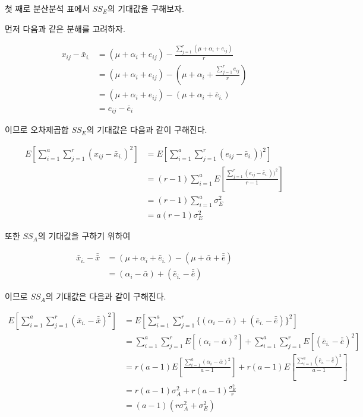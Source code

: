 \documentclass[
]{book}
\theoremstyle{definition}
\theoremstyle{definition}
\theoremstyle{definition}
\theoremstyle{remark}
\begin{document}
첫 째로 분산분석 표에서 \(SS_E\)의 기대값을 구해보자.

먼저 다음과 같은 분해를 고려하자.

\begin{align*}
x_{ij}-\bar x_{i.} &= (\mu + \alpha_i + e_{ij}) -\frac{ \sum_{j=1}^r (\mu + \alpha_i + e_{ij})}{r} \\
 & = (\mu + \alpha_i + e_{ij})  - \left (\mu + \alpha_i + \frac{ \sum_{j=1}^r e_{ij}}{r} \right ) \\ 
 & = (\mu + \alpha_i + e_{ij}) -(\mu + \alpha_i + \bar e_{i.}) \\
 &= e_{ij}-\bar e_{i}
\end{align*}

이므로 오차제곱합 \(SS_E\)의 기대값은 다음과 같이 구해진다.

\begin{align*}
 E \left [ \sum_{i=1}^a \sum_{j=1}^r (x_{ij}-\bar x_{i.})^2 \right ] 
 &= E \left [ \sum_{i=1}^a \sum_{j=1}^r (e_{ij}-\bar e_{i.}))^2 \right ] \\
 &= (r-1) \sum_{i=1}^a E \left [ \frac{   \sum_{j=1}^r  (e_{ij}-\bar e_{i.}))^2 }{r-1} \right ] \\
 &= (r-1) \sum_{i=1}^a \sigma^2_E \\
 &= a(r-1) \sigma^2_E 
\end{align*}

또한 \(SS_A\)의 기대값을 구하기 위하여

\begin{align*}
\bar x_{i.} -\bar {\bar x}  &= (\mu + \alpha_i + \bar e_{i.}) -(\mu + \bar \alpha + \bar {\bar e}) \\
  & = (\alpha_i -\bar \alpha) + (\bar e_{i.}- \bar {\bar e}) 
\end{align*}

이므로 \(SS_A\)의 기대값은 다음과 같이 구해진다.

\begin{align*}
 E \left [ \sum_{i=1}^a \sum_{j=1}^r (\bar x_{i.} -\bar {\bar x} )^2 \right ]
 &= E \left [ \sum_{i=1}^a \sum_{j=1}^r \{(\alpha_i -\bar \alpha) + (\bar e_{i.}-\bar {\bar e})\}^2 \right ] \\
 &= \sum_{i=1}^a \sum_{j=1}^r E  [(\alpha_i -\bar \alpha)^2 ] + \sum_{i=1}^a \sum_{j=1}^r E  [(\bar e_{i.}- \bar{\bar e})^2 ]  \\
 &= r(a-1)E \left  [    \frac{\sum_{i=1}^a(\alpha_i -\bar \alpha)^2}{a-1} \right ] 
 + r(a-1)   E \left [ \frac{\sum_{i=1}^a(\bar e_{i.}-\bar{\bar e})^2}{a-1} \right ]  \\
 &= r(a-1) \sigma^2_A + r(a-1)\frac{\sigma^2_E}{r} \\
 &= (a-1)(r\sigma^2_A+ \sigma^2_E) \\
\end{align*}
\end{document}
